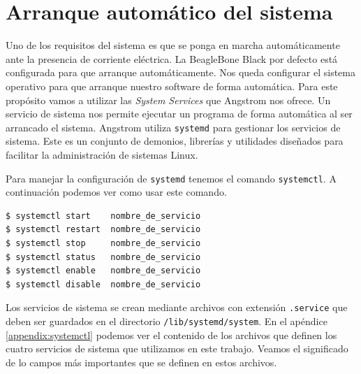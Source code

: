 \section{Arranque automático del sistema}
	Uno de los requisitos del sistema es que se ponga en marcha automáticamente ante la presencia de corriente eléctrica. La BeagleBone Black por
	defecto está configurada para que arranque automáticamente. Nos queda configurar el sistema operativo para que arranque nuestro software de
	forma automática. Para este propósito vamos a utilizar las \emph{System Services}\cite{AngSystemctl} que Angstrom nos ofrece. Un servicio de
	sistema nos permite ejecutar un programa de forma automática al ser arrancado el sistema. Angstrom utiliza \texttt{systemd}\cite{systemdWiki}
	para gestionar los servicios de sistema. Este es un conjunto de demonios, librerías y utilidades diseñados para facilitar la administración de
	sistemas Linux.
	\par
	Para manejar la configuración de \texttt{systemd} tenemos el comando \texttt{systemctl}. A continuación podemos ver como usar este comando.
	\begin{lstlisting}[style=myBash]
$ systemctl start    nombre_de_servicio
$ systemctl restart  nombre_de_servicio
$ systemctl stop     nombre_de_servicio
$ systemctl status   nombre_de_servicio
$ systemctl enable   nombre_de_servicio
$ systemctl disable  nombre_de_servicio
	\end{lstlisting}
	Los servicios de sistema se crean mediante archivos con extensión \texttt{.service} que deben ser guardados en el directorio
	\texttt{/lib/systemd/system}. En el apéndice \ref{appendix:systemctl} podemos ver el contenido de los archivos que definen los cuatro
	servicios de sistema que utilizamos en este trabajo. Veamos el significado de lo campos más importantes que se definen en estos archivos.
